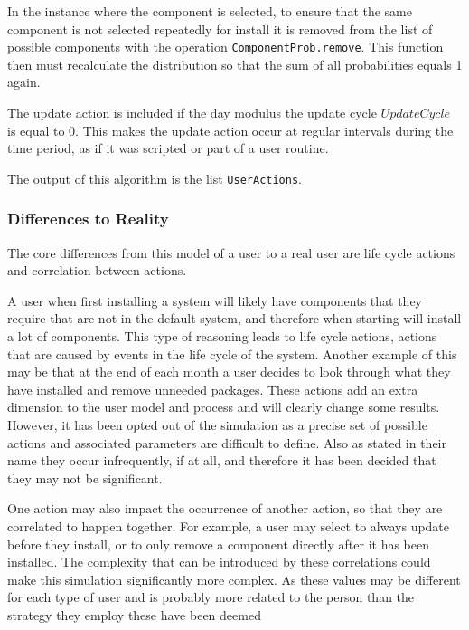 In the instance where the component is selected, to ensure that the same component is not selected repeatedly for install it is removed from the list of possible components
with the operation \verb+ComponentProb.remove+.
This function then must recalculate the distribution so that the sum of all probabilities equals 1 again.

The update action is included if the day modulus the update cycle $UpdateCycle$ is equal to 0.
This makes the update action occur at regular intervals during the time period, as if it was scripted or part of a user routine.

The output of this algorithm is the list \verb+UserActions+.

\subsubsection{Differences to Reality}
The core differences from this model of a user to a real user are life cycle actions and correlation between actions.

A user when first installing a system will likely have components that they require that are not in the default system, and therefore when starting will install a lot of components.
This type of reasoning leads to life cycle actions, actions that are caused by events in the life cycle of the system.
Another example of this may be that at the end of each month a user decides to look through what they have installed and remove unneeded packages.
These actions add an extra dimension to the user model and process and will clearly change some results.
However, it has been opted out of the simulation as a precise set of possible actions and associated parameters are difficult to define.
Also as stated in their name they occur infrequently, if at all, and therefore it has been decided that they may not be significant.  

One action may also impact the occurrence of another action, so that they are correlated to happen together.
For example, a user may select to always update before they install, or to only remove a component directly after it has been installed.
The complexity that can be introduced by these correlations could make this simulation significantly more complex.
As these values may be different for each type of user and is probably more related to the person than the strategy they employ these have been deemed 

